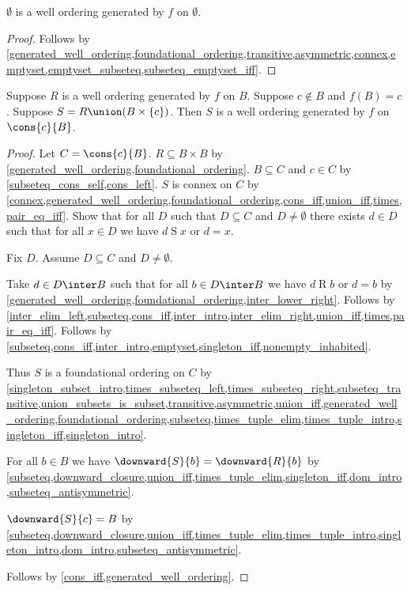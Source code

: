 \begin{lemma}\label{empty_generated_well_ordering}
    $\emptyset$ is a well ordering generated by $f$ on $\emptyset$.
\end{lemma}
\begin{proof}
    Follows by \cref{generated_well_ordering,foundational_ordering,transitive,asymmetric,connex,emptyset,emptyset_subseteq,subseteq_emptyset_iff}.
\end{proof}

\begin{lemma}\label{generated_well_ordering_adjoin}
    Suppose $R$ is a well ordering generated by $f$ on $B$.
    Suppose $c\notin B$ and $f(B)=c$.
    Suppose $S=R\union(B\times\{c\})$.
    Then $S$ is a well ordering generated by $f$ on $\cons{c}{B}$.
\end{lemma}
\begin{proof}
    Let $C=\cons{c}{B}$.
    $R\subseteq B\times B$ by \cref{generated_well_ordering,foundational_ordering}.
    $B\subseteq C$ and $c\in C$ by \cref{subseteq_cons_self,cons_left}.
    $S$ is connex on $C$
        by \cref{connex,generated_well_ordering,foundational_ordering,cons_iff,union_iff,times,pair_eq_iff}.
    Show that for all $D$ such that $D\subseteq C$ and $D\neq\emptyset$
        there exists $d\in D$ such that for all $x\in D$ we have $d\mathrel{S}x$ or $d=x$.
    \begin{subproof}
        Fix $D$.
        Assume $D\subseteq C$ and $D\neq\emptyset$.
        \begin{byCase}
            Take $d\in D\inter B$ such that for all $b\in D\inter B$
                we have $d\mathrel{R}b$ or $d=b$
                by \cref{generated_well_ordering,foundational_ordering,inter_lower_right}.
            Follows by \cref{inter_elim_left,subseteq,cons_iff,inter_intro,inter_elim_right,union_iff,times,pair_eq_iff}.
            Follows by \cref{subseteq,cons_iff,inter_intro,emptyset,singleton_iff,nonempty_inhabited}.
        \end{byCase}
    \end{subproof}

    Thus $S$ is a foundational ordering on $C$
        by \cref{singleton_subset_intro,times_subseteq_left,times_subseteq_right,subseteq_transitive,union_subsets_is_subset,transitive,asymmetric,union_iff,generated_well_ordering,foundational_ordering,subseteq,times_tuple_elim,times_tuple_intro,singleton_iff,singleton_intro}.

    For all $b\in B$ we have $\downward{S}{b}=\downward{R}{b}$
        by \cref{subseteq,downward_closure,union_iff,times_tuple_elim,singleton_iff,dom_intro,subseteq_antisymmetric}.

    $\downward{S}{c}=B$
        by \cref{subseteq,downward_closure,union_iff,times_tuple_elim,times_tuple_intro,singleton_intro,dom_intro,subseteq_antisymmetric}.

    Follows by \cref{cons_iff,generated_well_ordering}.
\end{proof}

